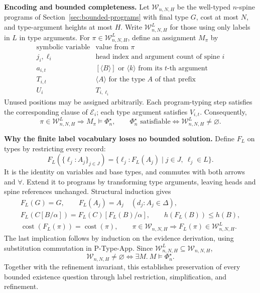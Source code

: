 \documentclass[10pt,a4paper]{article}
\newcommand{\iarg}[1]{\langle#1\rangle}
\begin{document}
\textbf{Encoding and bounded completeness.}
Let $\mathcal W_{n,N,H}$ be the well-typed $n$-spine programs of Section~\ref{sec:bounded-programs}
with final type $G$, cost at most $N$, and type-argument heights at most $H$.
Write $\mathcal W^L_{n,N,H}$ for those using only labels in $L$ in type arguments.
For $\pi\in\mathcal W^L_{n,N,H}$, define an assignment $M_\pi$ by
\[
\begin{array}{c|c}
 \text{symbolic variable} & \text{value from }\pi\\ \hline
 j_i,\ell_i & \text{head index and argument count of spine }i\\
 a_{i,t} & [\langle B\rangle]\text{ or }\iarg{k}\text{ from its }t\text{-th argument}\\
 T_{i,t} & \langle A\rangle\text{ for the type }A\text{ of that prefix}\\
 U_i & T_{i,\ell_i}
\end{array}
\]
Unused positions may be assigned arbitrarily. Each program-typing step satisfies
the corresponding clause of $\mathcal E_i$; each type argument satisfies $V_{i,t}$.
Consequently,
\[
 \pi\in\mathcal W^L_{n,N,H}
 \Longrightarrow M_\pi\models\Phi_n^\star,
 \qquad
 \boxed{\Phi_n^\star\text{ satisfiable}\iff\mathcal W^L_{n,N,H}\ne\varnothing.}
\]

\newpage
\textbf{Why the finite label vocabulary loses no bounded solution.}
Define $F_L$ on types by restricting every record:
\[
 F_L(\{\ell_j:A_j\}_{j\in J})
   =\{\ell_j:F_L(A_j)\mid j\in J,\ \ell_j\in L\}.
\]
It is the identity on variables and base types, and commutes with both arrows and
$\forall$. Extend it to programs by transforming type arguments, leaving heads and
spine references unchanged. Structural induction gives
\[
\begin{gathered}
 F_L(G)=G,\qquad F_L(A_j)=A_j\quad(d_j:A_j\in\Delta),\\
 F_L(C[B/\alpha])=F_L(C)[F_L(B)/\alpha],\qquad
 h(F_L(B))\le h(B),\\
 \operatorname{cost}(F_L(\pi))=\operatorname{cost}(\pi),\qquad
 \pi\in\mathcal W_{n,N,H}\Longrightarrow F_L(\pi)\in\mathcal W^L_{n,N,H}.
\end{gathered}
\]
The last implication follows by induction on the evidence derivation, using
substitution commutation in P-Type-App. Since
$\mathcal W^L_{n,N,H}\subseteq\mathcal W_{n,N,H}$,
\[
 \boxed{
 \mathcal W_{n,N,H}\ne\varnothing
 \iff \exists M.\ M\models\Phi_n^\star.}
\]
Together with the refinement invariant, this establishes preservation of every
bounded existence question through label restriction, simplification, and refinement.
\end{document}
